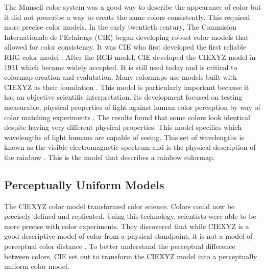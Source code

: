 \documentclass[journal,12pt]{IEEEtran}
\begin{document}
The Munsell color system was a good way to describe the appearance of color but it did
not prescribe a way to create the same colors consistently.
This required more precise color models. In the early twentieth century,
The Commision Internationale de l'Eclairage (CIE) began developing robust color models
that allowed for color consistency. It was CIE who first developed the first reliable
RBG color model \cite{colorimetry}.
After the RGB model, CIE developed the CIEXYZ model in 1931
which became widely accepted. It is still used today and is critical to colormap creation
and evalutation. Many colormaps use models built with CIEXYZ as their foundation \cite{viridis}.
This model is particularly important because it has an objective scientific interpretation.
Its development focused on testing measurable, physical properties of light
against human color perception by way of color matching experiments 
\cite{colorimetry}. The results found that some colors look identical despite having very different physical
properties. This model specifies which wavelengths of light humans 
are capable of seeing. This set of wavelengths is known as the visible electromagnetic
spectrum and is the physical description of the rainbow \cite{colormapping}. This is the model
that describes a rainbow colormap.

\subsection{Perceptually Uniform Models}

The CIEXYZ color model transformed color science. Colors could now be precisely defined and replicated.
Using this technology, scientists were able to be more precise with color experiments.
They discovered that while CIEXYZ is a good descriptive model of color from a physical standpoint, it
is not a model of perceptual color distance \cite{viridis}.
To better understand the
perceptual difference between colors, CIE set out to
transform the CIEXYZ model into a perceptually uniform color model.
\end{document}
